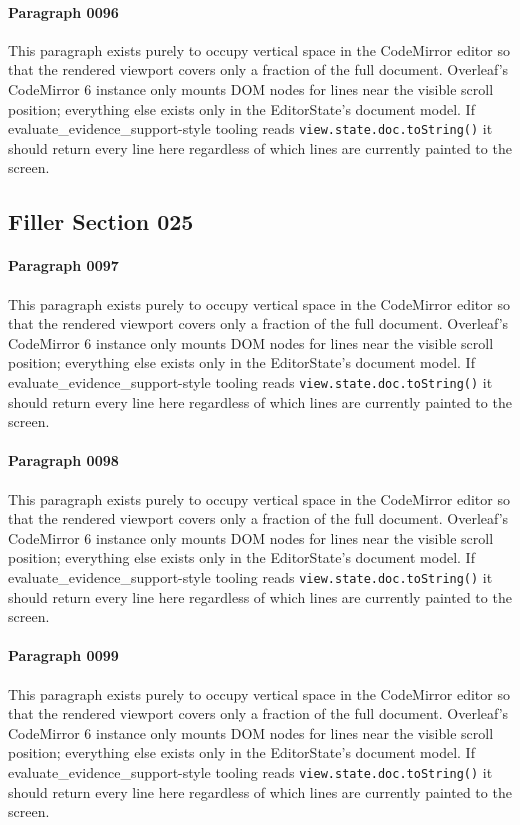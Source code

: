 \documentclass{article}
\begin{document}
\paragraph{Paragraph 0096}
This paragraph exists purely to occupy vertical space in the CodeMirror editor so that the rendered viewport covers only a fraction of the full document. Overleaf's CodeMirror 6 instance only mounts DOM nodes for lines near the visible scroll position; everything else exists only in the EditorState's document model. If evaluate\_evidence\_support-style tooling reads \texttt{view.state.doc.toString()} it should return every line here regardless of which lines are currently painted to the screen.

\subsection{Filler Section 025}
\paragraph{Paragraph 0097}
This paragraph exists purely to occupy vertical space in the CodeMirror editor so that the rendered viewport covers only a fraction of the full document. Overleaf's CodeMirror 6 instance only mounts DOM nodes for lines near the visible scroll position; everything else exists only in the EditorState's document model. If evaluate\_evidence\_support-style tooling reads \texttt{view.state.doc.toString()} it should return every line here regardless of which lines are currently painted to the screen.

\paragraph{Paragraph 0098}
This paragraph exists purely to occupy vertical space in the CodeMirror editor so that the rendered viewport covers only a fraction of the full document. Overleaf's CodeMirror 6 instance only mounts DOM nodes for lines near the visible scroll position; everything else exists only in the EditorState's document model. If evaluate\_evidence\_support-style tooling reads \texttt{view.state.doc.toString()} it should return every line here regardless of which lines are currently painted to the screen.

\paragraph{Paragraph 0099}
This paragraph exists purely to occupy vertical space in the CodeMirror editor so that the rendered viewport covers only a fraction of the full document. Overleaf's CodeMirror 6 instance only mounts DOM nodes for lines near the visible scroll position; everything else exists only in the EditorState's document model. If evaluate\_evidence\_support-style tooling reads \texttt{view.state.doc.toString()} it should return every line here regardless of which lines are currently painted to the screen.
\end{document}
